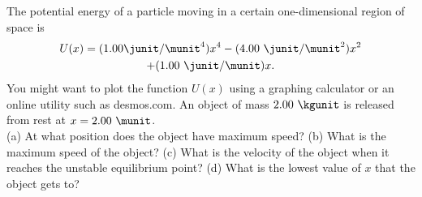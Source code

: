 The potential energy of a particle moving
in a certain one-dimensional region of space is
\begin{multline*}
  U(x) = (1.00 \junit/\munit^4) x^4 - (4.00\ \junit/\munit^2) x^2 \\ + (1.00\ \junit/\munit) x.
\end{multline*}
You might want to plot the function $U(x)$ using
a graphing calculator or an online utility such as desmos.com.
An object of mass $2.00\ \kgunit$ is released from rest at
$x = 2.00\ \munit$. \\
%
(a) At what position does the object have maximum speed?\answercheck\hwendpart
%
(b) What is the maximum speed of the object?\answercheck\hwendpart
%
(c) What is the velocity of the object when it reaches the unstable equilibrium
point?\answercheck\hwendpart
%
(d) What is the lowest value of $x$ that the object gets to?\answercheck
